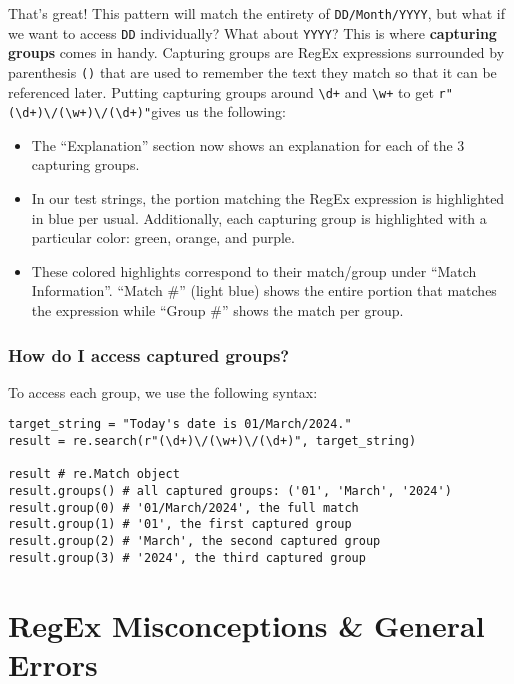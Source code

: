 \documentclass[
  letterpaper,
  DIV=11,
  numbers=noendperiod]{scrreprt}
\providecommand{\tightlist}{%
  \setlength{\itemsep}{0pt}\setlength{\parskip}{0pt}}\usepackage{longtable,booktabs,array}
\begin{document}
That's great! This pattern will match the entirety of
\texttt{DD/Month/YYYY}, but what if we want to access \texttt{DD}
individually? What about \texttt{YYYY}? This is where \textbf{capturing
groups} comes in handy. Capturing groups are RegEx expressions
surrounded by parenthesis \texttt{()} that are used to remember the text
they match so that it can be referenced later. Putting capturing groups
around \texttt{\textbackslash{}d+} and \texttt{\textbackslash{}w+} to
get
\texttt{r"(\textbackslash{}d+)\textbackslash{}/(\textbackslash{}w+)\textbackslash{}/(\textbackslash{}d+)"}gives
us the following:

\begin{itemize}
\tightlist
\item
  The ``Explanation'' section now shows an explanation for each of the 3
  capturing groups.
\item
  In our test strings, the portion matching the RegEx expression is
  highlighted in blue per usual. Additionally, each capturing group is
  highlighted with a particular color: green, orange, and purple.
\item
  These colored highlights correspond to their match/group under ``Match
  Information''. ``Match \#'' (light blue) shows the entire portion that
  matches the expression while ``Group \#'' shows the match per group.
\end{itemize}

\subsubsection{How do I access captured
groups?}\label{how-do-i-access-captured-groups}

To access each group, we use the following syntax:

\begin{verbatim}
target_string = "Today's date is 01/March/2024."
result = re.search(r"(\d+)\/(\w+)\/(\d+)", target_string)

result # re.Match object
result.groups() # all captured groups: ('01', 'March', '2024')
result.group(0) # '01/March/2024', the full match
result.group(1) # '01', the first captured group
result.group(2) # 'March', the second captured group
result.group(3) # '2024', the third captured group
\end{verbatim}

\section{RegEx Misconceptions \& General
Errors}\label{regex-misconceptions-general-errors}
\end{document}
